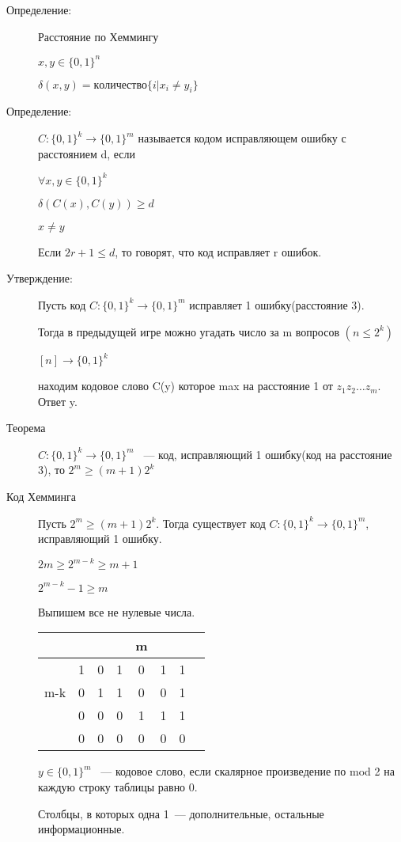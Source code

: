 \documentclass[12pt]{article}
\begin{document}
\begin{description}
\item[Определение:] Расстояние по Хеммингу

 $x, y \in \{0, 1\}^n$

$\delta (x, y) = количество \{i| x_i \ne y_i\}$

\item[Определение:] $C: \{0, 1\}^k \to \{0, 1\}^m$ называется кодом исправляющем ошибку с расстоянием d, если 

$\forall x, y \in \{0, 1\}^k$

$\delta (C(x), C(y)) \ge d$

$x \ne y$

Если $2r + 1 \le d$, то говорят, что код исправляет r ошибок. 

\item[Утверждение:] Пусть код $C:\{0, 1\}^k \to \{0, 1\}^m$ исправляет 1 ошибку(расстояние 3).

Тогда в предыдущей игре можно угадать число за m вопросов $(n \le 2^k)$

$[n] \to  \{0, 1\}^k$

находим кодовое слово C(y) которое max на расстояние 1 от $z_1 z_2 \ldots z_m$. Ответ y.

\item[Теорема] $C:\{0, 1\}^k \to \{0, 1\}^m$ ~--- код, исправляющий 1 ошибку(код на расстояние 3), то $2^m \ge (m + 1)2^k$

\item[Код Хемминга]

Пусть $2^m \ge (m + 1)2^k$. Тогда существует код $C:\{0, 1\}^k \to \{0, 1\}^m$, исправляющий 1 ошибку. 

$2m \ge 2^{m - k} \ge m + 1$

$2^{m - k} - 1 \ge m$

Выпишем все не нулевые числа.

\begin{tabular}{|c|c|c|c|c|c|c|c|}
\hline
&&&&m&&&\\
\hline
&1&0&1&0&1&1&\\
m-k&0&1&1&0&0&1&\\
&0&0&0&1&1&1&\\
&0&0&0&0&0&0&\\
\hline
\end{tabular}

$y \in \{0, 1\}^m$ ~--- кодовое слово, если скалярное произведение по mod 2 на каждую строку таблицы равно 0.

Столбцы, в которых одна 1~--- дополнительные, остальные информационные. 


\end{description}
\end{document}
